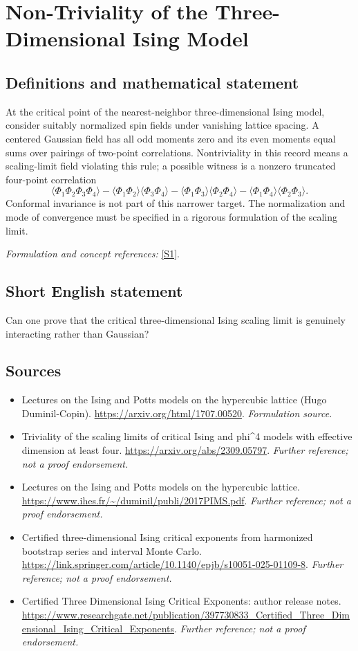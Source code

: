 \documentclass[11pt]{article}
\begin{document}
\section*{\texorpdfstring{Non-Triviality of the Three-Dimensional Ising Model}{Non-Triviality of the Three-Dimensional Ising Model}}\label{30006710}
\subsection{Definitions and mathematical statement}
At the critical point of the nearest-neighbor three-dimensional Ising model, consider suitably normalized spin fields under vanishing lattice spacing. A centered Gaussian field has all odd moments zero and its even moments equal sums over pairings of two-point correlations. Nontriviality in this record means a scaling-limit field violating this rule; a possible witness is a nonzero truncated four-point correlation
\[
 \langle\Phi_1\Phi_2\Phi_3\Phi_4\rangle
 -\langle\Phi_1\Phi_2\rangle\langle\Phi_3\Phi_4\rangle
 -\langle\Phi_1\Phi_3\rangle\langle\Phi_2\Phi_4\rangle
 -\langle\Phi_1\Phi_4\rangle\langle\Phi_2\Phi_3\rangle.
\]
Conformal invariance is not part of this narrower target. The normalization and mode of convergence must be specified in a rigorous formulation of the scaling limit.
\par\smallskip\textit{Formulation and concept references:} \href{https://arxiv.org/html/1707.00520}{[S1]}.

\subsection{Short English statement}
Can one prove that the critical three-dimensional Ising scaling limit is genuinely interacting rather than Gaussian?
\subsection{Sources}
\begin{itemize}
\item[S1]Lectures on the Ising and Potts models on the hypercubic lattice (Hugo Duminil-Copin).
\url{https://arxiv.org/html/1707.00520}.
\textit{Formulation source.}
\item[S2]Triviality of the scaling limits of critical Ising and phi\textasciicircum{}4 models with effective dimension at least four.
\url{https://arxiv.org/abs/2309.05797}.
\textit{Further reference; not a proof endorsement.}
\item[S3]Lectures on the Ising and Potts models on the hypercubic lattice.
\url{https://www.ihes.fr/~/duminil/publi/2017PIMS.pdf}.
\textit{Further reference; not a proof endorsement.}
\item[S4]Certified three-dimensional Ising critical exponents from harmonized bootstrap series and interval Monte Carlo.
\url{https://link.springer.com/article/10.1140/epjb/s10051-025-01109-8}.
\textit{Further reference; not a proof endorsement.}
\item[S5]Certified Three Dimensional Ising Critical Exponents: author release notes.
\url{https://www.researchgate.net/publication/397730833_Certified_Three_Dimensional_Ising_Critical_Exponents}.
\textit{Further reference; not a proof endorsement.}
\end{itemize}
\end{document}

